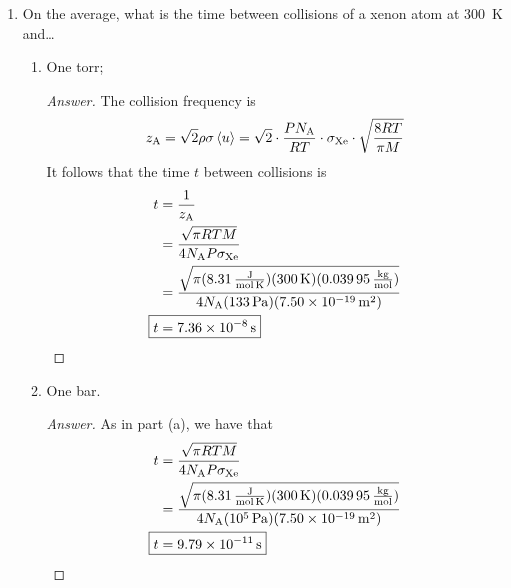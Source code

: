 \documentclass[../psets.tex]{subfiles}
\begin{document}
\begin{enumerate}[label={\textbf{27-\arabic*.}},leftmargin=3.5em]
\begin{proof}[Answer]
\begin{figure}[H]
\begin{subfigure}[b]{0.3\linewidth}
                \caption{3}
            \end{subfigure}
        \end{figure}
    \end{proof}
    \setcounter{enumi}{35}
    \item On the average, what is the time between collisions of a xenon atom at \SI{300}{\kelvin} and\dots
    \begin{enumerate}
        \item One torr;
        \begin{proof}[Answer]
            The collision frequency is
            \begin{equation*}
                z_{\ce{A}} = \sqrt{2}\rho\sigma\prb{u}
                = \sqrt{2}\cdot\frac{P\NA}{RT}\cdot\sigma_{\ce{Xe}}\cdot\sqrt{\frac{8RT}{\pi M}}
            \end{equation*}
            It follows that the time $t$ between collisions is
            \begin{align*}
                t &= \frac{1}{z_{\ce{A}}}\\
                &= \frac{\sqrt{\pi RTM}}{4\NA P\sigma_{\ce{Xe}}}\\
                &= \frac{\sqrt{\pi(\SI[per-mode=fraction]{8.31}{\joule\per\mole\per\kelvin})(\SI{300}{\kelvin})(\SI[per-mode=fraction]{0.03995}{\kilo\gram\per\mole})}}{4\NA(\SI{133}{\pascal})(\SI{7.50e-19}{\square\meter})}\\
                \Aboxed{t &= \SI{7.36e-8}{\second}}
            \end{align*}
        \end{proof}
        \item One bar.
        \begin{proof}[Answer]
            As in part (a), we have that
            \begin{align*}
                t &= \frac{\sqrt{\pi RTM}}{4\NA P\sigma_{\ce{Xe}}}\\
                &= \frac{\sqrt{\pi(\SI[per-mode=fraction]{8.31}{\joule\per\mole\per\kelvin})(\SI{300}{\kelvin})(\SI[per-mode=fraction]{0.03995}{\kilo\gram\per\mole})}}{4\NA(\SI{e5}{\pascal})(\SI{7.50e-19}{\square\meter})}\\
                \Aboxed{t &= \SI{9.79e-11}{\second}}
            \end{align*}

\end{proof}
\end{enumerate}
\end{enumerate}
\end{document}
